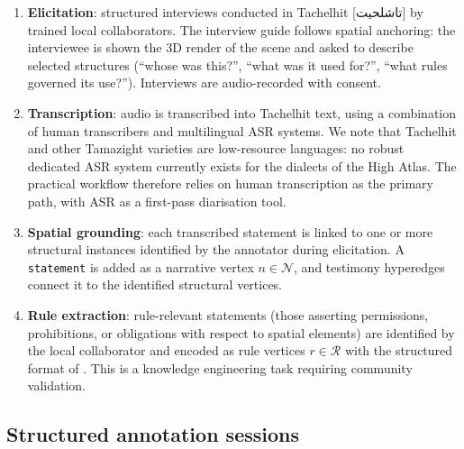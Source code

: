 \documentclass[11pt,a4paper]{article}
\theoremstyle{plain}
\theoremstyle{definition}
\theoremstyle{remark}
\newcommand{\Nar}{\mathcal{N}}
\newcommand{\Rul}{\mathcal{R}}
\newcommand{\textarabic}[1]{{\arabicfont #1}}
\begin{document}
\begin{enumerate}[leftmargin=2em]
  \item \textbf{Elicitation}: structured interviews conducted in
    Tachelhit [\textarabic{تاشلحيت}] by trained local collaborators. The interview guide
    follows spatial anchoring: the interviewee is shown the 3D
    render of the scene and asked to describe selected structures
    (``whose was this?'', ``what was it used for?'', ``what rules
    governed its use?''). Interviews are audio-recorded with consent.

  \item \textbf{Transcription}: audio is transcribed into Tachelhit
    text, using a combination of human transcribers and
    multilingual ASR systems. We note that Tachelhit and other
    Tamazight varieties are low-resource languages: no robust
    dedicated ASR system currently exists for the dialects of the
    High Atlas. The practical workflow therefore relies on human
    transcription as the primary path, with ASR as a first-pass
    diarisation tool.

  \item \textbf{Spatial grounding}: each transcribed statement is
    linked to one or more structural instances identified by the
    annotator during elicitation. A \texttt{statement} is added as a
    narrative vertex $n \in \Nar$, and testimony hyperedges connect
    it to the identified structural vertices.

  \item \textbf{Rule extraction}: rule-relevant statements (those
    asserting permissions, prohibitions, or obligations with respect
    to spatial elements) are identified by the local collaborator
    and encoded as rule vertices $r \in \Rul$ with the structured
    format of . This is a knowledge engineering
    task requiring community validation.
\end{enumerate}

\subsection{Structured annotation sessions}
\label{sec:fieldwork_annotation}
\end{document}

